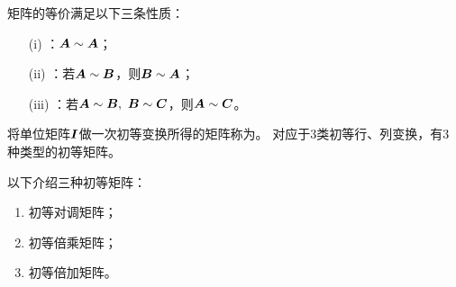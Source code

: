 \begin{frame}
  \begin{xingzhi}
    矩阵的等价满足以下三条性质：
    \begin{itemize}
    \item[(i)] ：$\boldsymbol{A} \sim \boldsymbol{A}$；
    \item[(ii)] ：若$\boldsymbol{A} \sim \boldsymbol{B}$，则$\boldsymbol{B} \sim \boldsymbol{A}$；
    \item[(iii)] ：若$\boldsymbol{A} \sim \boldsymbol{B}, ~\boldsymbol{B} \sim \boldsymbol{C}$，则$\boldsymbol{A} \sim \boldsymbol{C}$。
    \end{itemize}
  \end{xingzhi}
\end{frame}


\begin{frame}

  \begin{dingyi}[初等矩阵]
    将单位矩阵$\boldsymbol{I}$做一次初等变换所得的矩阵称为。
    对应于$3$类初等行、列变换，有$3$种类型的初等矩阵。
  \end{dingyi}
\end{frame}


\begin{frame}
  以下介绍三种初等矩阵：
  \begin{enumerate}
  \item 初等对调矩阵；
  \item 初等倍乘矩阵；
  \item 初等倍加矩阵。
  \end{enumerate}
\end{frame}


